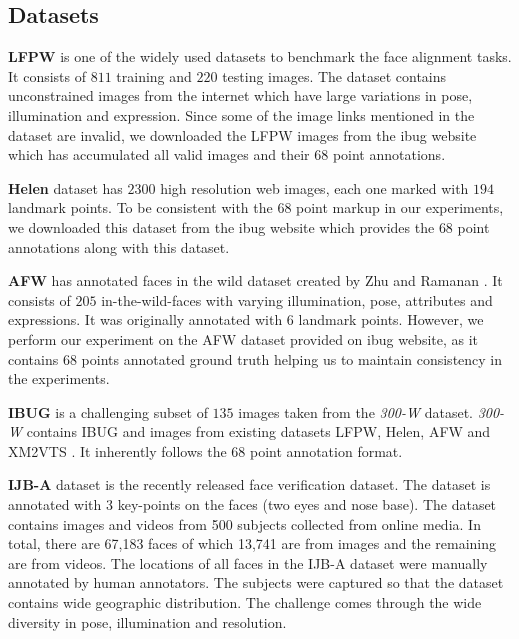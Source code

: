\documentclass[10pt,twocolumn,letterpaper]{article}
\begin{document}
\subsection{Datasets}
\textbf{LFPW} \cite{Belhumeur:2011:LPF:2191740.2192193} is one of the widely used datasets to benchmark the face alignment tasks. It consists of $811$ training and $220$ testing images. The dataset contains unconstrained images from the internet which have large variations in pose, illumination and expression. Since some of the image links mentioned in the dataset are invalid, we downloaded the LFPW images from the ibug \cite{6595977} website which has accumulated all valid images and their $68$ point annotations. \par
\textbf{Helen} \cite{Le:2012:IFF:2403072.2403124} dataset has $2300$ high resolution web images, each one marked with $194$ landmark points. To be consistent with the $68$ point markup in our experiments, we downloaded this dataset from the ibug website which provides the $68$ point annotations along with this dataset. \par
\textbf{AFW} has annotated faces in the wild dataset created by Zhu and Ramanan \cite{AFW_dataset_CVPR2012}. It consists of $205$ in-the-wild-faces with varying illumination, pose, attributes and expressions. It was originally annotated with $6$ landmark points. However, we perform our experiment on the AFW dataset provided on ibug website, as it contains $68$ points annotated ground truth helping us to maintain consistency in the experiments.\par
\textbf{IBUG} is a challenging subset of $135$ images taken from the \textit{300-W} \cite{6595977} dataset. \textit{300-W} contains IBUG and images from existing datasets LFPW, Helen, AFW and XM2VTS \cite{Messer99xm2vtsdb:the}. It inherently follows the $68$ point annotation format. \par
\textbf{IJB-A} \cite{F._2015_CVPR} dataset is the recently released face verification dataset. The dataset is annotated with 3 key-points on the faces (two eyes and nose base). The dataset contains images and videos from 500
subjects collected from online media. In total, there are 67,183 faces of which 13,741 are from images and
the remaining are from videos. The locations of all faces in the IJB-A dataset were manually annotated by human annotators. The subjects were captured so that the dataset contains wide geographic distribution. The challenge comes through the wide diversity in pose, illumination and resolution. 
\end{document}
